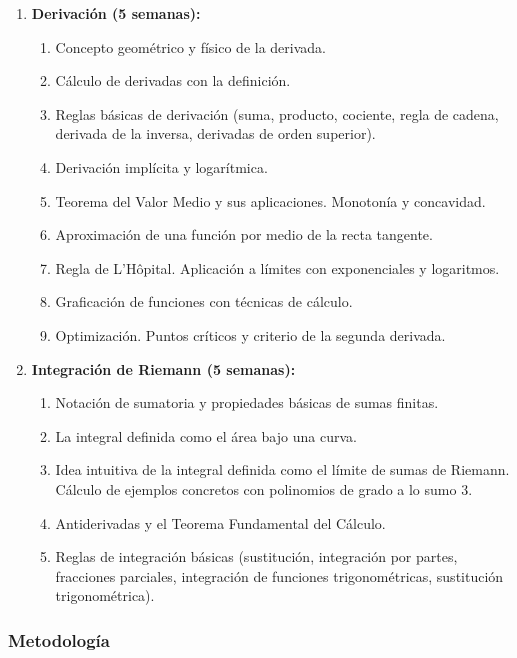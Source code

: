 \begin{refsection}
\begin{enumerate}
\item \textbf{Derivación (5 semanas):} 
\begin{enumerate}
    \item Concepto geométrico y físico de la derivada.
    \item Cálculo de derivadas con la definición.
    \item Reglas básicas de derivación (suma, producto, cociente, regla de cadena, derivada de la inversa, derivadas de orden superior).
    \item Derivación implícita y logarítmica.
    \item Teorema del Valor Medio y sus aplicaciones. Monotonía y concavidad.
    \item Aproximación de una función por medio de la recta tangente. 
    \item Regla de L'Hôpital. Aplicación a límites con exponenciales y logaritmos. 
    \item Graficación de funciones con técnicas de cálculo. 
    \item Optimización. Puntos críticos y criterio de la segunda derivada.
\end{enumerate}

\item \textbf{Integración de Riemann (5 semanas):} 
\begin{enumerate}
    \item Notación de sumatoria y propiedades básicas de sumas finitas.
    \item La integral definida como el área bajo una curva.
    \item Idea intuitiva de la integral definida como el límite de sumas de Riemann. Cálculo de ejemplos concretos con polinomios de grado a lo sumo 3.
    \item Antiderivadas y el Teorema Fundamental del Cálculo.
    \item Reglas de integración básicas (sustitución, integración por partes, fracciones parciales, integración de funciones trigonométricas, sustitución trigonométrica).
\end{enumerate}


\end{enumerate}

\subsubsection*{Metodología}


\end{refsection}
